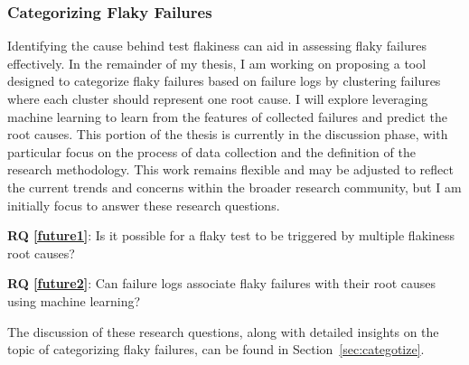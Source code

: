 \subsubsection{Categorizing Flaky Failures}

Identifying the cause behind test flakiness can aid in assessing flaky failures effectively. In the remainder of my thesis, I am working on proposing a tool designed to categorize flaky failures based on failure logs by clustering failures where each cluster should represent one root cause.
I will explore leveraging machine learning to learn from the features of collected failures and predict the root causes.
This portion of the thesis is currently in the discussion phase, with particular focus on the process of data collection and the definition of the research methodology. This work remains flexible and may be adjusted to reflect the current trends and concerns within the broader research community, but I am initially focus to answer these research questions. 

\begin{description}
    \item \textbf{RQ \ref{future1}}: Is it possible for a flaky test to be triggered by multiple flakiness root causes?
    \item \textbf{RQ  \ref{future2}}: Can failure logs associate flaky failures with their root causes using machine learning?
\end{description}

The discussion of these research questions, along with detailed insights on the topic of categorizing flaky failures, can be found in Section~\ref{sec:categotize}.



